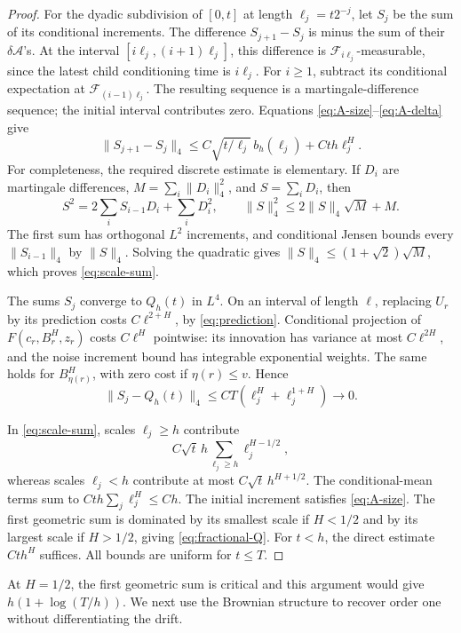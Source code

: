 \documentclass[11pt]{article}
\theoremstyle{remark}
\newcommand{\F}{\mathcal F}
\newcommand{\Acal}{\mathcal A}
\newcommand{\norm}[1]{\lVert#1\rVert}
\begin{document}
\begin{proof}
For the dyadic subdivision of \([0,t]\) at length
\(\ell_j=t2^{-j}\), let \(S_j\) be the sum of its conditional
increments. The difference \(S_{j+1}-S_j\) is minus the sum of their
\(\delta\Acal\)'s. At the interval \([i\ell_j,(i+1)\ell_j]\),
this difference is \(\F_{i\ell_j}\)-measurable, since the latest
child conditioning time is \(i\ell_j\). For \(i\ge1\), subtract its
conditional expectation at \(\F_{(i-1)\ell_j}\).
The resulting sequence is a martingale-difference sequence; the
initial interval contributes zero. Equations
\eqref{eq:A-size}--\eqref{eq:A-delta} give
\begin{equation}\label{eq:scale-sum}
 \norm{S_{j+1}-S_j}_4
 \le C\sqrt{t/\ell_j}\,b_h(\ell_j)+Cth\ell_j^H.
\end{equation}
For completeness, the required discrete estimate is elementary.
If \(D_i\) are martingale differences, \(M=\sum_i\norm{D_i}_4^2\),
and \(S=\sum_iD_i\), then
\[
 S^2=2\sum_iS_{i-1}D_i+\sum_iD_i^2,\qquad
 \norm S_4^2\le2\norm S_4\sqrt M+M.
\]
The first sum has orthogonal \(L^2\) increments, and conditional
Jensen bounds every \(\norm{S_{i-1}}_4\) by \(\norm S_4\).
Solving the quadratic gives
\(\norm S_4\le(1+\sqrt2)\sqrt M\), which proves
\eqref{eq:scale-sum}.

The sums \(S_j\) converge to \(Q_h(t)\) in \(L^4\).
On an interval of length \(\ell\), replacing \(U_r\) by its prediction
costs \(C\ell^{2+H}\), by \eqref{eq:prediction}.
Conditional projection of \(F(c_r,B^H_r,z_r)\) costs \(C\ell^H\)
pointwise: its innovation has variance at most \(C\ell^{2H}\),
and the noise increment bound has integrable exponential weights.
The same holds for \(B^H_{\eta(r)}\), with zero cost if
\(\eta(r)\le v\). Hence
\[
 \norm{S_j-Q_h(t)}_4\le CT(\ell_j^H+\ell_j^{1+H})\longrightarrow0.
\]

In \eqref{eq:scale-sum}, scales \(\ell_j\ge h\) contribute
\[
 C\sqrt t\,h\sum_{\ell_j\ge h}\ell_j^{H-1/2},
\]
whereas scales \(\ell_j<h\) contribute at most
\(C\sqrt t\,h^{H+1/2}\).
The conditional-mean terms sum to
\(Cth\sum_j\ell_j^H\le Ch\).
The initial increment satisfies \eqref{eq:A-size}.
The first geometric sum is dominated by its smallest scale if
\(H<1/2\) and by its largest scale if \(H>1/2\), giving
\eqref{eq:fractional-Q}. For \(t<h\), the direct estimate
\(Cth^H\) suffices. All bounds are uniform for \(t\le T\).
\end{proof}

At \(H=1/2\), the first geometric sum is critical and this argument
would give \(h(1+\log(T/h))\). We next use the Brownian structure to
recover order one without differentiating the drift.
\end{document}
